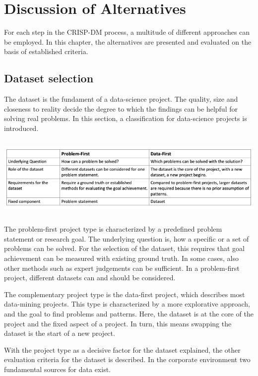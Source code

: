 \chapter{Discussion of Alternatives}
For each step in the \ac{CRISP-DM} process, a multitude of different approaches can be employed. In this chapter, the alternatives are presented and evaluated on the basis of established criteria.

\section{Dataset selection}

	The dataset is the fundament of a data-science project. The quality, size and closeness to reality decide the degree to which the findings can be helpful for solving real problems. 
	In this section, a classification for data-science projects is introduced.
	
	\includegraphics[height=4cm]{Bilder/meta_project.png}
	
	The problem-first project type is characterized by a predefined problem statement or research goal. The underlying question is, how a specific or a set of problems can be solved. For the selection of the dataset, this requires that goal achievement can be measured with existing ground truth. In some cases, also other methods such as expert judgements can be sufficient. In a problem-first project, different datasets can and should be considered.
	
	The complementary project type is the data-first project, which describes most data-mining projects. This type is characterized by a more explorative approach, and the goal to find problems and patterns. Here, the dataset is at the core of the project and the fixed aspect of a project. In turn, this means swapping the dataset is the start of a new project.
	
	With the project type as a decisive factor for the dataset explained, the other evaluation criteria for the dataset is described. In the corporate environment two fundamental sources for data exist. 
	
